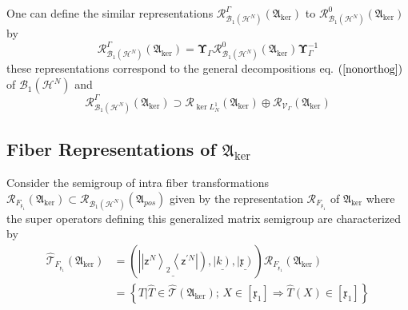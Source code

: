 \documentclass[aps,preprint]{revtex4}%
\begin{document}
One can define the similar representations $\mathcal{R}_{\mathcal{B}%
_{1}\left(  \mathcal{H}^{N}\right)  }^{\Gamma}\left(  \mathfrak{A}_{\ker
}\right)  $ to $\mathcal{R}_{\mathcal{B}_{1}\left(  \mathcal{H}^{N}\right)
}^{0}\left(  \mathfrak{A}_{\ker}\right)  $ by
\begin{equation}
\mathcal{R}_{\mathcal{B}_{1}\left(  \mathcal{H}^{N}\right)  }^{\Gamma}\left(
\mathfrak{A}_{\ker}\right)  =\mathbf{\Upsilon}_{\Gamma}\mathcal{R}%
_{\mathcal{B}_{1}\left(  \mathcal{H}^{N}\right)  }^{0}\left(  \mathfrak{A}%
_{\ker}\right)  \mathbf{\Upsilon}_{\Gamma}^{-1}%
\end{equation}
these representations correspond to the general decompositions eq. $\left(
\ref{nonorthog}\right)  $ of $\mathcal{B}_{1}\left(  \mathcal{H}^{N}\right)  $
and
\begin{equation}
\mathcal{R}_{\mathcal{B}_{1}\left(  \mathcal{H}^{N}\right)  }^{\Gamma}\left(
\mathfrak{A}_{\ker}\right)  \supset\mathcal{R}_{\ker L_{N}^{1}}\left(
\mathfrak{A}_{\ker}\right)  \oplus\mathcal{R}_{\mathcal{V}_{\Gamma}}\left(
\mathfrak{A}_{\ker}\right)
\end{equation}


\subsection{Fiber Representations of $\mathfrak{A}_{\ker}\label{fiberrep}$}

Consider the semigroup of intra fiber transformations $\mathcal{R}%
_{F_{\mathfrak{x}_{1}}}\left(  \mathfrak{A}_{\ker}\right)  \subset
\mathcal{R}_{\mathcal{B}_{1}\left(  \mathcal{H}^{N}\right)  }\left(
\mathfrak{A}_{pos}\right)  $ given by the representation $\mathcal{R}%
_{F_{\mathfrak{x}_{1}}}$ of $\mathfrak{A}_{\ker}$ where the super operators
defining this generalized matrix semigroup are characterized by
\begin{align}
\mathcal{\hat{T}}_{F_{\mathfrak{x}_{1}}}\left(  \mathfrak{A}_{\ker}\right)
&  =\left(  \underline{\left\vert \left\vert \mathsf{z}^{N}\right\rangle
_{2}\left\langle \mathsf{z}^{\prime N}\right\vert \right)  },\underline
{\left\vert k\right)  },\underline{\left\vert \mathfrak{x}\right)  }\right)
\mathcal{R}_{F_{\mathfrak{x}_{1}}}\left(  \mathfrak{A}_{\ker}\right)
\nonumber\\
&  =\left\{  \hat{T}|\hat{T}\in\mathcal{\hat{T}}\left(  \mathfrak{A}_{\ker
}\right)  ;\,X\in\left[  \mathfrak{x}_{1}\right]  \Rightarrow\hat{T}\left(
X\right)  \in\left[  \mathfrak{x}_{1}\right]  \right\}
\end{align}
\end{document}
